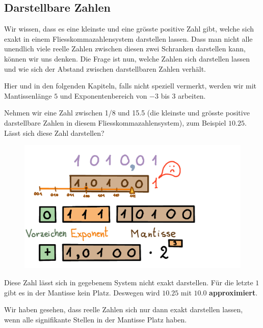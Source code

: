 \subsection{Darstellbare Zahlen}

Wir wissen, dass es eine kleinste und eine grösste positive Zahl gibt, welche sich exakt in einem Fliesskommazahlensystem darstellen lassen. Dass man nicht alle unendlich viele reelle Zahlen zwischen diesen zwei Schranken darstellen kann, können wir uns denken. Die Frage ist nun, welche Zahlen sich darstellen lassen und wie sich der Abstand zwischen darstellbaren Zahlen verhält.

Hier und in den folgenden Kapiteln, falls nicht speziell vermerkt, werden wir mit Mantissenlänge \(5\) und Exponentenbereich von \(-3\) bis \(3\) arbeiten.

\begin{beispiel}
Nehmen wir eine Zahl zwischen 1/8 und 15.5 (die kleinste und grösste positive darstellbare Zahlen in diesem Fliesskommazahlensystem), zum Beispiel \(10.25\). Lässt sich diese Zahl darstellen?

\begin{figure}[H]
\centering
\includegraphics[width=0.75\linewidth]{Pictures/ZahlenDarstellen10-25.png}
\end{figure}

Diese Zahl lässt sich in gegebenem System nicht exakt darstellen. Für die letzte \(1\) gibt es in der Mantisse kein Platz. Deswegen wird \(10.25\) mit \(10.0\) \textbf{approximiert}.
\end{beispiel}

Wir haben gesehen, dass reelle Zahlen sich nur dann exakt darstellen lassen, wenn alle signifikante Stellen in der Mantisse Platz haben.

